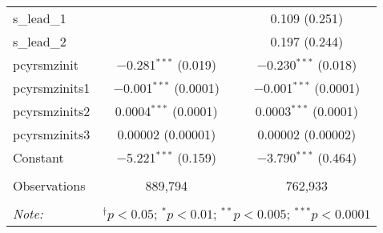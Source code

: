 \begin{table}[!htbp]
\begin{tabular}{@{\extracolsep{5pt}}lcc}
  s\_lead\_1 &  & 0.109 (0.251) \\ 
  s\_lead\_2 &  & 0.197 (0.244) \\ 
  pcyrsmzinit & $-$0.281$^{***}$ (0.019) & $-$0.230$^{***}$ (0.018) \\ 
  pcyrsmzinits1 & $-$0.001$^{***}$ (0.0001) & $-$0.001$^{***}$ (0.0001) \\ 
  pcyrsmzinits2 & 0.0004$^{***}$ (0.0001) & 0.0003$^{***}$ (0.0001) \\ 
  pcyrsmzinits3 & 0.00002 (0.00001) & 0.00002 (0.00002) \\ 
  Constant & $-$5.221$^{***}$ (0.159) & $-$3.790$^{***}$ (0.464) \\ 
 \hline \\[-1.8ex] 
Observations & 889,794 & 762,933 \\ 
\hline 
\hline \\[-1.8ex] 
\textit{Note:}  & \multicolumn{2}{r}{$^{\dagger} p<0.05$; $^{*} p<0.01$; $^{**} p<0.005$; $^{***} p<0.0001$} \\ 
\end{tabular} 
\end{table} 
